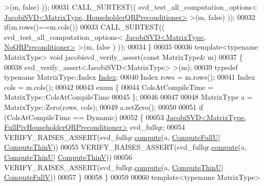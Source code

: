 \begin{DoxyCode}
        >(m, \textcolor{keyword}{false}) ));
00031   CALL\_SUBTEST(( svd\_test\_all\_computation\_options<
      \hyperlink{group___s_v_d___module_class_eigen_1_1_jacobi_s_v_d}{JacobiSVD<MatrixType, HouseholderQRPreconditioner>}       
       >(m, \textcolor{keyword}{false}) ));
00032   \textcolor{keywordflow}{if}(m.rows()==m.cols())
00033     CALL\_SUBTEST(( svd\_test\_all\_computation\_options<
      \hyperlink{group___s_v_d___module_class_eigen_1_1_jacobi_s_v_d}{JacobiSVD<MatrixType, NoQRPreconditioner>}               >(m, \textcolor{keyword}{false}
      ) ));
00034 \}
00035 
00036 \textcolor{keyword}{template}<\textcolor{keyword}{typename} MatrixType> \textcolor{keywordtype}{void} jacobisvd\_verify\_assert(\textcolor{keyword}{const} MatrixType& m)
00037 \{
00038   svd\_verify\_assert<JacobiSVD<MatrixType> >(m);
00039   \textcolor{keyword}{typedef} \textcolor{keyword}{typename} MatrixType::Index \hyperlink{namespace_eigen_a62e77e0933482dafde8fe197d9a2cfde}{Index};
00040   Index rows = m.rows();
00041   Index cols = m.cols();
00042 
00043   \textcolor{keyword}{enum} \{
00044     ColsAtCompileTime = MatrixType::ColsAtCompileTime
00045   \};
00046 
00047 
00048   MatrixType a = MatrixType::Zero(rows, cols);
00049   a.setZero();
00050 
00051   \textcolor{keywordflow}{if} (ColsAtCompileTime == Dynamic)
00052   \{
00053     \hyperlink{group___s_v_d___module_class_eigen_1_1_jacobi_s_v_d}{JacobiSVD<MatrixType, FullPivHouseholderQRPreconditioner>}
       svd\_fullqr;
00054     VERIFY\_RAISES\_ASSERT(svd\_fullqr.\hyperlink{group___s_v_d___module_a5dab376cc86cf0d36674bcdad4af3f5a}{compute}(a, \hyperlink{group__enums_ggae3e239fb70022eb8747994cf5d68b4a9a2b4f91ca5859a4159dbfe8090043817f}{ComputeFullU}|
      \hyperlink{group__enums_ggae3e239fb70022eb8747994cf5d68b4a9a1055e53fa95c8ae04a07ebb72cfafd95}{ComputeThinV}))
00055     VERIFY\_RAISES\_ASSERT(svd\_fullqr.\hyperlink{group___s_v_d___module_a5dab376cc86cf0d36674bcdad4af3f5a}{compute}(a, \hyperlink{group__enums_ggae3e239fb70022eb8747994cf5d68b4a9af8c742a1aa87773e165eae406c9ccaf8}{ComputeThinU}|
      \hyperlink{group__enums_ggae3e239fb70022eb8747994cf5d68b4a9a1055e53fa95c8ae04a07ebb72cfafd95}{ComputeThinV}))
00056     VERIFY\_RAISES\_ASSERT(svd\_fullqr.\hyperlink{group___s_v_d___module_a5dab376cc86cf0d36674bcdad4af3f5a}{compute}(a, \hyperlink{group__enums_ggae3e239fb70022eb8747994cf5d68b4a9af8c742a1aa87773e165eae406c9ccaf8}{ComputeThinU}|
      \hyperlink{group__enums_ggae3e239fb70022eb8747994cf5d68b4a9a52c6f7e80bbf9a42297c88f700245b51}{ComputeFullV}))
00057   \}
00058 \}
00059 
00060 template<typename MatrixType>

\end{DoxyCode}
